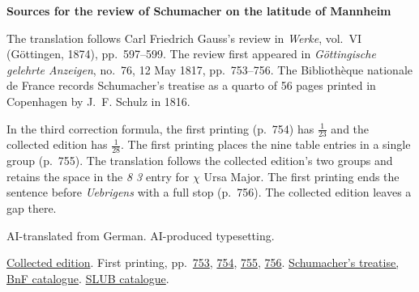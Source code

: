 \clearpage\thispagestyle{empty}
\begin{center}\Large\bfseries Sources for the review of Schumacher on the latitude of Mannheim\end{center}

The translation follows Carl Friedrich Gauss’s review in \emph{Werke}, vol.~VI (Göttingen, 1874), pp.~597--599. The review first appeared in \emph{Göttingische gelehrte Anzeigen}, no.~76, 12 May 1817, pp.~753--756. The Bibliothèque nationale de France records Schumacher’s treatise as a quarto of 56 pages printed in Copenhagen by J.~F. Schulz in 1816.

In the third correction formula, the first printing (p.~754) has $\frac{1}{23}$ and the collected edition has $\frac{1}{28}$. The first printing places the nine table entries in a single group (p.~755). The translation follows the collected edition’s two groups and retains the space in the \emph{8 3} entry for $\chi$ Ursa Major. The first printing ends the sentence before \emph{Uebrigens} with a full stop (p.~756). The collected edition leaves a gap there.

AI-translated from German. AI-produced typesetting.

\href{https://gdz.sub.uni-goettingen.de/id/PPN236007467}{Collected edition}. First printing, pp.~\href{https://images.p.sub.uni-goettingen.de/iiif/image/gdz:PPN319721507_1817:00000765/full/1650,/0/default.jpg}{753}, \href{https://images.p.sub.uni-goettingen.de/iiif/image/gdz:PPN319721507_1817:00000766/full/1650,/0/default.jpg}{754}, \href{https://images.p.sub.uni-goettingen.de/iiif/image/gdz:PPN319721507_1817:00000767/full/1650,/0/default.jpg}{755}, \href{https://images.p.sub.uni-goettingen.de/iiif/image/gdz:PPN319721507_1817:00000768/full/1650,/0/default.jpg}{756}. \href{https://catalogue.bnf.fr/ark:/12148/cb31334340p}{Schumacher’s treatise, BnF catalogue}. \href{https://katalog.slub-dresden.de/en/id/0-1132488389}{SLUB catalogue}.

\clearpage
